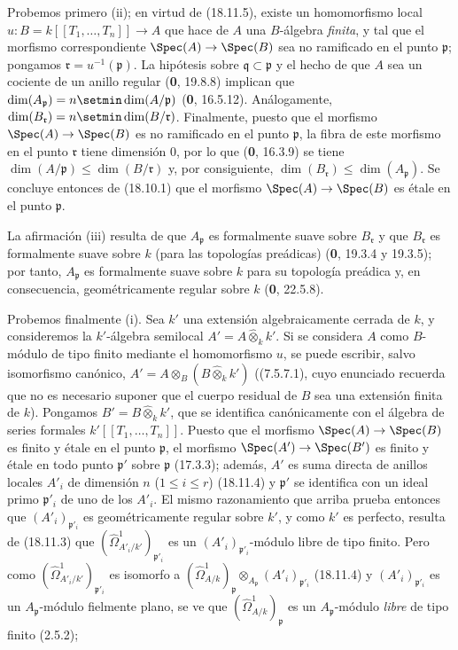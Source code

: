 Probemos primero (ii); en virtud de (18.11.5), existe un homomorfismo local
$u:B=k[[T_1,\ldots,T_n]]\to A$
que hace de $A$ una $B$-álgebra \emph{finita}, y tal que el morfismo correspondiente $\Spec(A)\to\Spec(B)$ sea no ramificado en el punto $\mathfrak p$; pongamos $\mathfrak r=u^{-1}(\mathfrak p)$. La hipótesis sobre $\mathfrak q\subset\mathfrak p$ y el hecho de que $A$ sea un cociente de un anillo regular (\textbf 0, 19.8.8) implican que $\dim(A_{\mathfrak p})=n\setmin\dim(A/\mathfrak p)$ (\textbf 0, 16.5.12). Análogamente, $\dim(B_{\mathfrak r})=n\setmin\dim(B/\mathfrak r)$. Finalmente, puesto que el morfismo $\Spec(A)\to\Spec(B)$ es no ramificado en el punto $\mathfrak p$, la fibra de este morfismo en el punto $\mathfrak r$ tiene dimensión 0, por lo que (\textbf 0, 16.3.9) se tiene $\dim(A/\mathfrak p)\leq\dim(B/\mathfrak r)$ y, por consiguiente, $\dim(B_{\mathfrak r})\leq\dim(A_{\mathfrak p})$. Se concluye entonces de (18.10.1) que el morfismo $\Spec(A)\to\Spec(B)$ es étale en el punto $\mathfrak p$.

La afirmación (iii) resulta de que $A_{\mathfrak p}$ es formalmente suave sobre $B_{\mathfrak r}$ y que $B_{\mathfrak r}$ es formalmente suave sobre $k$ (para las topologías preádicas) (\textbf 0, 19.3.4 y 19.3.5); por tanto, $A_{\mathfrak p}$ es formalmente suave sobre $k$ para su topología preádica y, en consecuencia, geométricamente regular sobre $k$ (\textbf 0, 22.5.8).

Probemos finalmente (i). Sea $k'$ una extensión algebraicamente cerrada de $k$, y consideremos la $k'$-álgebra semilocal $A'=A\widehat{\otimes}_k k'$. Si se considera $A$ como $B$-módulo de tipo finito mediante el homomorfismo $u$, se puede escribir, salvo isomorfismo canónico, $A'=A\otimes_B(B\widehat{\otimes}_k k')$ ((7.5.7.1), cuyo enunciado recuerda que no es necesario suponer que el cuerpo residual de $B$ sea una extensión finita de $k$). Pongamos $B'=B\widehat{\otimes}_k k'$, que se identifica canónicamente con el álgebra de series formales $k'[[T_1,\ldots,T_n]]$. Puesto que el morfismo $\Spec(A)\to\Spec(B)$ es finito y étale en el punto $\mathfrak p$, el morfismo $\Spec(A')\to\Spec(B')$ es finito y étale en todo punto $\mathfrak p'$ sobre $\mathfrak p$ (17.3.3); además, $A'$ es suma directa de anillos locales $A'_i$ de dimensión $n$ ($1\leq i\leq r$) (18.11.4) y $\mathfrak p'$ se identifica con un ideal primo $\mathfrak p'_i$ de uno de los $A'_i$. El mismo razonamiento que arriba prueba entonces que $(A'_i)_{\mathfrak p'_i}$ es geométricamente regular sobre $k'$, y como $k'$ es perfecto, resulta de (18.11.3) que $(\hat{\Omega}^1_{A'_i/k'})_{\mathfrak p'_i}$ es un $(A'_i)_{\mathfrak p'_i}$-módulo libre de tipo finito. Pero como $(\hat{\Omega}^1_{A'_i/k'})_{\mathfrak p'_i}$ es isomorfo a $(\hat{\Omega}^1_{A/k})_{\mathfrak p}\otimes_{A_{\mathfrak p}}(A'_i)_{\mathfrak p'_i}$ (18.11.4) y $(A'_i)_{\mathfrak p'_i}$ es un $A_{\mathfrak p}$-módulo fielmente plano, se ve que $(\hat{\Omega}^1_{A/k})_{\mathfrak p}$ es un $A_{\mathfrak p}$-módulo \emph{libre} de tipo finito (2.5.2);


